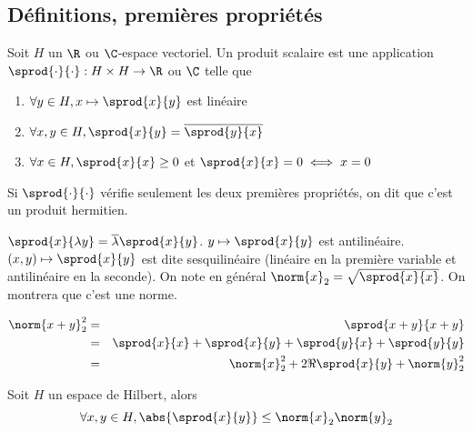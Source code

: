 \subsection{Définitions, premières propriétés}

\begin{definition}
	Soit $H$ un $\R$ ou $\C$-espace vectoriel.
	Un produit scalaire est une application $\sprod{\cdot}{\cdot} : H \times H \to \R$ ou $\C$ telle que
	\begin{enumerate}
		\item $\forall y \in H, x \mapsto \sprod{x}{y}$ est linéaire
		\item $\forall x,y \in H, \sprod{x}{y} = \overline{\sprod{y}{x}}$
		\item $\forall x \in H, \sprod{x}{x} \geq 0$ et $\sprod{x}{x} = 0 \iff x = 0$
	\end{enumerate}

	Si $\sprod{\cdot}{\cdot}$ vérifie seulement les deux premières propriétés, on dit que c'est un produit hermitien.
\end{definition}

\begin{remarque}
	$\sprod{x}{\lambda y} = \overline{\lambda} \sprod{x}{y} $.
	$y \mapsto \sprod{x}{y}$ est antilinéaire.
	$(x,y) \mapsto \sprod{x}{y}$ est dite sesquilinéaire (linéaire en la première variable et antilinéaire en la seconde).
	On note en général $\norm{x}_2 = \sqrt{\sprod{x}{x}}$. On montrera que c'est une norme.
\end{remarque}

\begin{remarque}
	\begin{eqnarray*}
		\norm{x + y}_2^2 &=& \sprod{x + y}{x + y}\\
		&=& \sprod{x}{x} + \sprod{x}{y} + \sprod{y}{x} + \sprod{y}{y}\\
		&=& \norm{x}_2^2 + 2\Re \sprod{x}{y} + \norm{y}_2^2
	\end{eqnarray*}
\end{remarque}

\begin{prop}
	Soit $H$ un espace de Hilbert, alors
	$$ \forall x,y \in H, \abs{\sprod{x}{y}} \leq \norm{x}_2 \norm{y}_2 $$
\end{prop}


